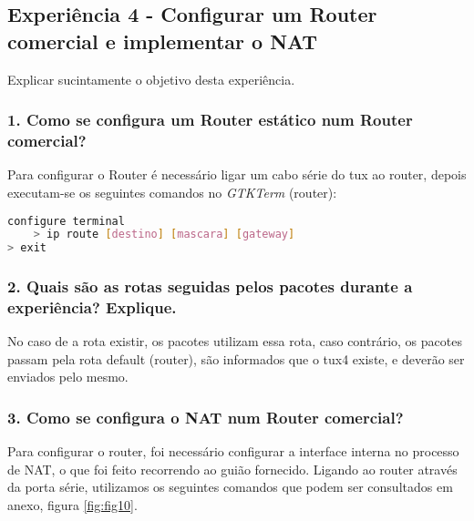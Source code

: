 \subsection*{Experiência 4 - Configurar um Router comercial e implementar o NAT}
Explicar sucintamente o objetivo desta experiência.

\subsubsection{1. Como se configura um Router estático num Router comercial?}
Para configurar o Router é necessário ligar um cabo série do tux ao router, depois executam-se os seguintes comandos no \emph{GTKTerm} (router):

\begin{lstlisting}[language=bash]
	configure terminal
	> ip route [destino] [mascara] [gateway]
> exit
\end{lstlisting}

\subsubsection{2. Quais são as rotas seguidas pelos pacotes durante a experiência? Explique.}
No caso de a rota existir, os pacotes utilizam essa rota, caso contrário, os pacotes passam pela rota default (router), são informados que o tux4 existe, e deverão ser enviados pelo mesmo.

\subsubsection{3. Como se configura o NAT num Router comercial?}
Para configurar o router, foi necessário configurar a interface interna no processo de NAT, o que foi feito recorrendo ao guião fornecido. Ligando ao router através da porta série, utilizamos os seguintes comandos que podem ser consultados em anexo, figura \ref{fig:fig10}.

